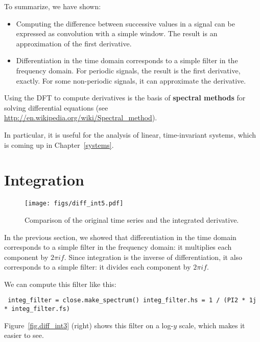 \documentclass[12pt]{book} \usepackage[width=5.5in,height=8.5in, hmarginratio=3:2,vmarginratio=1:1]{geometry}
\begin{document}
To summarize, we have shown: 

\begin{itemize} 

\item Computing the difference between successive values in a signal can be expressed as convolution with a simple window. The result is an approximation of the first derivative. 

\item Differentiation in the time domain corresponds to a simple filter in the frequency domain. For periodic signals, the result is the first derivative, exactly. For some non-periodic signals, it can approximate the derivative. 

\end{itemize} 

Using the DFT to compute derivatives is the basis of {\bf spectral methods} for solving differential equations (see \url{http://en.wikipedia.org/wiki/Spectral_method}). 

In particular, it is useful for the analysis of linear, time-invariant systems, which is coming up in Chapter~\ref{systems}. 

\section{Integration} 

\begin{figure} 

\centerline{\texttt{[image: figs/diff\_int5.pdf]}} \caption{Comparison of the original time series and the integrated derivative.} \label{fig.diff_int5} \end{figure} 

In the previous section, we showed that differentiation in the time domain corresponds to a simple filter in the frequency domain: it multiplies each component by $2 \pi i f$. Since integration is the inverse of differentiation, it also corresponds to a simple filter: it divides each component by $2 \pi i f$. 

We can compute this filter like this: 

\begin{verbatim} integ_filter = close.make_spectrum() integ_filter.hs = 1 / (PI2 * 1j * integ_filter.fs) \end{verbatim} 

Figure~\ref{fig.diff_int3} (right) shows this filter on a log-$y$ scale, which makes it easier to see. 
\end{document}
